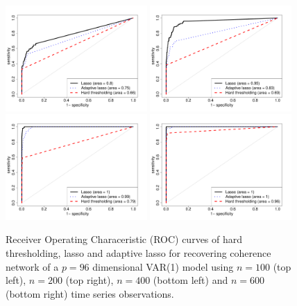 \begin{figure}[!t]
    \centering
    \includegraphics[width=0.48\textwidth]{img/ROC_100_96.pdf}
    \includegraphics[width=0.48\textwidth]{img/ROC_200_96.pdf}
    \includegraphics[width=0.48\textwidth]{img/ROC_400_96.pdf} 
    \includegraphics[width=0.48\textwidth]{img/ROC_600_96.pdf}    
    \caption{Receiver Operating Characeristic (ROC) curves of hard thresholding, lasso and adaptive lasso for recovering coherence network of a $p = 96$ dimensional VAR(1) model using $n = 100$ (top left), $n = 200$ (top right), $n = 400$ (bottom left) and $n = 600$ (bottom right) time series observations.}
    \label{fig:roc}
\end{figure}


